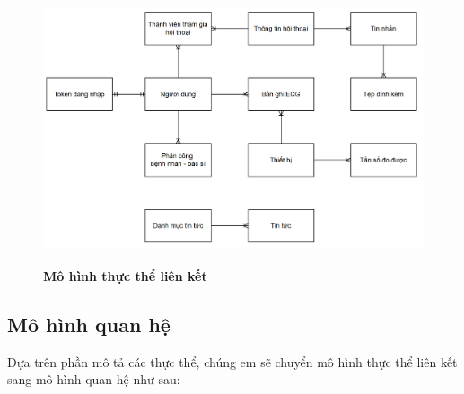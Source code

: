 \begin{figure}[H]
  \centering
  \includegraphics[width=15cm,height=8cm]{Images/system/fmECG_connection_entity.png}
  \caption[Mô hình thực thể liên kết]{\bfseries \fontsize{12pt}{0pt}
  \selectfont Mô hình thực thể liên kết}
  \label{ttlk} %
\end{figure}

\subsection{Mô hình quan hệ}
Dựa trên phần mô tả các thực thể, chúng em sẽ chuyển mô hình thực thể liên kết sang mô hình quan hệ như sau:

